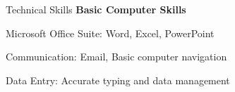 \begin{resume_section}{Technical Skills}
    \textbf{Basic Computer Skills}
    \begin{subitems}
        \item Microsoft Office Suite: Word, Excel, PowerPoint
        \item Communication: Email, Basic computer navigation
        \item Data Entry: Accurate typing and data management
    \end{subitems}
\end{resume_section}

